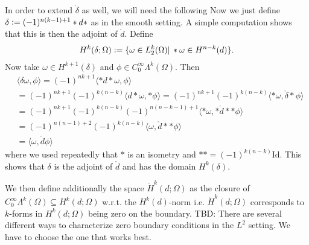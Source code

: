 \documentclass[12pt,a4paper]{article}
\theoremstyle{definition}
\newcommand{\smoothcompforms}[2]{C_0^\infty \Lambda^{#1}(#2)}
\begin{document}
In order to extend $\mathring{\delta}$ as well, we will need the following
Now we just define $\delta \vcentcolon= (-1)^{n(k-1)+1}*d*$ as in the smooth
setting. A simple computation shows that this is 
then the adjoint of $\mathring{d}$. Define 
\begin{align*}
    H^k(\delta; \Omega) \vcentcolon= \{ \omega \in L^k_2(\Omega) | \,
    *\omega \in H^{n-k}(d) \}.
\end{align*}
Now take $\omega \in H^{k+1}(\delta)$ and $\phi \in 
\smoothcompforms{k}{\Omega}$. Then 
\begin{align*}
    &\langle \delta \omega, \phi \rangle = 
    (-1)^{nk+1} \langle *d* \omega, \phi \rangle \\  
    &= (-1)^{nk+1} (-1)^{k(n-k)} \langle d* \omega, *\phi \rangle =
    (-1)^{nk+1} (-1)^{k(n-k)} 
        \langle * \omega, \mathring{\delta}*\phi \rangle \\
    &= (-1)^{nk+1} (-1)^{k(n-k)} (-1)^{n(n-k-1)+1}
        \langle * \omega, *\mathring{d}**\phi \rangle \\
    &=(-1)^{n(n-1)+2} (-1)^{k(n-k)} \langle \omega, \mathring{d}**\phi \rangle\\
    &= \langle \omega, \mathring{d}\phi \rangle
\end{align*}
where we used repeatedly that $*$ is an isometry and 
$** = (-1)^{k(n-k)}\text{Id}$. This shows that $\delta$ is the adjoint of 
$\mathring{d}$ and has the domain $H^k(\delta)$.


We then define 
additionally the space $\mathring{H}^k(d;\Omega)$ as the closure of 
$C_0^\infty \Lambda^k(\Omega) \subseteq H^k(d;\Omega)$ w.r.t. 
the $H^k(d)$-norm i.e. 
$\mathring{H}^k(d;\Omega)$ corresponds to $k$-forms in $H^k(d;\Omega)$
being zero on the boundary. {\color{red} TBD: There are several different 
ways to characterize zero boundary conditions in the $L^2$ setting. We have
to choose the one that works best.}
\end{document}
